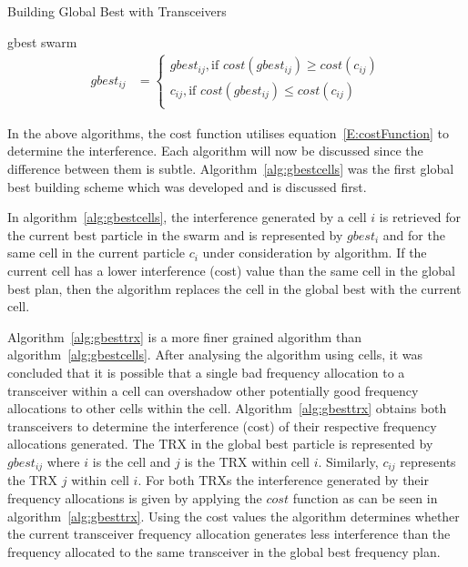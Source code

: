 \begin{algorithm}[H]
\caption{Building Global Best with Transceivers}
\label{alg:gbesttrx}
\begin{algorithmic}[1]
\Require gbest
\Require swarm
	\begin{align}
gbest_{ij}&=
    \begin{cases}
        gbest_{ij} , \text{if $cost(gbest_{ij}) \ge cost(c_{ij})$}\\
        c_{ij}, \text{if $cost(gbest_{ij}) \leq cost(c_{ij})$}\\
    \end{cases}
\end{align}
\EndFor
\end{algorithmic}
\end{algorithm}

In the above algorithms, the cost function utilises equation~\ref{E:costFunction} to determine the interference. Each algorithm will now be discussed since the difference between them is subtle. Algorithm~\ref{alg:gbestcells} was the first global best building scheme which was developed and is discussed first.

In algorithm~\ref{alg:gbestcells}, the interference generated by a cell $i$ is retrieved for the current best particle in the swarm and is represented by $gbest_i$ and for the same cell in the current particle $c_i$ under consideration by algorithm. If the current cell has a lower interference (cost) value than the same cell in the global best plan, then the algorithm replaces the cell in the global best with the current cell.

Algorithm~\ref{alg:gbesttrx} is a more finer grained algorithm than algorithm~\ref{alg:gbestcells}. After analysing the algorithm using cells, it was concluded that it is possible that a single bad frequency allocation to a transceiver within a cell can overshadow other potentially good frequency allocations to other cells within the cell. Algorithm~\ref{alg:gbesttrx} obtains both transceivers to determine the interference (cost) of their respective frequency allocations generated. The TRX in the global best particle is represented by $gbest_{ij}$ where $i$ is the cell and $j$ is the TRX within cell $i$. Similarly, $c_{ij}$ represents the TRX $j$ within cell $i$. For both TRXs the interference generated by their frequency allocations is given by applying the $cost$ function as can be seen in algorithm~\ref{alg:gbesttrx}. Using the cost values the algorithm determines whether the current transceiver frequency allocation generates less interference than the frequency allocated to the same transceiver in the global best frequency plan.

